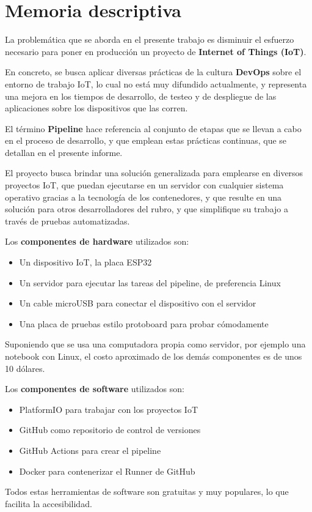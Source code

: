 \chapter{Memoria descriptiva}\label{cap:memoria}
La problemática que se aborda en el presente trabajo es disminuir el esfuerzo necesario para poner en producción un proyecto de \textbf{Internet of Things (IoT)}.

En concreto, se busca aplicar diversas prácticas de la cultura \textbf{DevOps} sobre el entorno de trabajo IoT, lo cual no está muy difundido actualmente, y representa una mejora en los tiempos de desarrollo, de testeo y de despliegue de las aplicaciones sobre los dispositivos que las corren.

El término \textbf{Pipeline} hace referencia al conjunto de etapas que se llevan a cabo en el proceso de desarrollo, y que emplean estas prácticas continuas, que se detallan en el presente informe.

El proyecto busca brindar una solución generalizada para emplearse en diversos proyectos IoT, que puedan ejecutarse en un servidor con cualquier sistema operativo gracias a la tecnología de los contenedores, y que resulte en una solución para otros desarrolladores del rubro, y que simplifique su trabajo a través de pruebas automatizadas.

Los \textbf{componentes de hardware} utilizados son:
\begin{itemize}
    \item Un dispositivo IoT, la placa ESP32
    \item Un servidor para ejecutar las tareas del pipeline, de preferencia Linux
    \item Un cable microUSB para conectar el dispositivo con el servidor
    \item Una placa de pruebas estilo protoboard para probar cómodamente
\end{itemize}

Suponiendo que se usa una computadora propia como servidor, por ejemplo una notebook con Linux, el costo aproximado de los demás componentes es de unos 10 dólares.

Los \textbf{componentes de software} utilizados son:
\begin{itemize}
\item PlatformIO para trabajar con los proyectos IoT
\item GitHub como repositorio de control de versiones
\item GitHub Actions para crear el pipeline
\item Docker para contenerizar el Runner de GitHub
\end{itemize}

Todos estas herramientas de software son gratuitas y muy populares, lo que facilita la accesibilidad.




